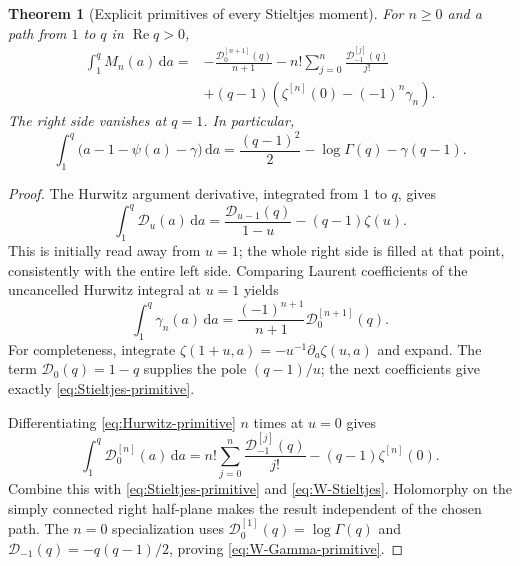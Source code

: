 \documentclass[11pt]{article}
\numberwithin{equation}{section}
\newtheorem{theorem}{Theorem}[section]
\theoremstyle{definition}
\DeclareMathOperator{\Rea}{Re}
\newcommand{\dd}{\,\mathrm d}
\newcommand{\DD}{\mathcal D}
\begin{document}
\begin{theorem}[Explicit primitives of every Stieltjes moment]\label{thm:W-primitives}
For $n\ge0$ and a path from $1$ to $q$ in $\Rea q>0$,
\begin{equation}\label{eq:W-primitive-all}
 \begin{split}
 \int_1^q M_n(a)\dd a={}&
 -\frac{\DD_0^{[n+1]}(q)}{n+1}
 -n!\sum_{j=0}^n\frac{\DD_{-1}^{[j]}(q)}{j!}\\
 &+(q-1)\left(\zeta^{[n]}(0)-(-1)^n\gamma_n\right).
 \end{split}
\end{equation}
The right side vanishes at $q=1$. In particular,
\begin{equation}\label{eq:W-Gamma-primitive}
 \int_1^q\bigl(a-1-\psi(a)-\gamma\bigr)\dd a
 =\frac{(q-1)^2}{2}-\log\Gamma(q)-\gamma(q-1).
\end{equation}
\end{theorem}
\begin{proof}
The Hurwitz argument derivative, integrated from $1$ to $q$, gives
\begin{equation}\label{eq:Hurwitz-primitive}
 \int_1^q\DD_u(a)\dd a
 =\frac{\DD_{u-1}(q)}{1-u}-(q-1)\zeta(u).
\end{equation}
This is initially read away from $u=1$; the whole right side is filled at that point, consistently with the entire left side. Comparing Laurent coefficients of the uncancelled Hurwitz integral at $u=1$ yields
\begin{equation}\label{eq:Stieltjes-primitive}
 \int_1^q\gamma_n(a)\dd a
 =\frac{(-1)^{n+1}}{n+1}\DD_0^{[n+1]}(q).
\end{equation}
For completeness, integrate $\zeta(1+u,a)=-u^{-1}\partial_a\zeta(u,a)$ and expand. The term $\DD_0(q)=1-q$ supplies the pole $(q-1)/u$; the next coefficients give exactly \eqref{eq:Stieltjes-primitive}.

Differentiating \eqref{eq:Hurwitz-primitive} $n$ times at $u=0$ gives
\[
 \int_1^q\DD_0^{[n]}(a)\dd a
 =n!\sum_{j=0}^n\frac{\DD_{-1}^{[j]}(q)}{j!}
  -(q-1)\zeta^{[n]}(0).
\]
Combine this with \eqref{eq:Stieltjes-primitive} and \eqref{eq:W-Stieltjes}. Holomorphy on the simply connected right half-plane makes the result independent of the chosen path. The $n=0$ specialization uses $\DD_0^{[1]}(q)=\log\Gamma(q)$ and $\DD_{-1}(q)=-q(q-1)/2$, proving \eqref{eq:W-Gamma-primitive}.
\end{proof}
\end{document}
